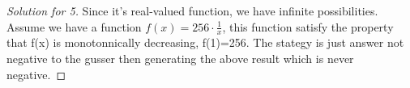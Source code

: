 \documentclass[12pt]{article}
\begin{document}
\begin{proof}[Solution for 5]
	Since it's real-valued function, we have infinite possibilities.\\
	Assume we have a function $f(x)=256\cdot\frac{1}{x}$, this function satisfy the property that f(x) is monotonnically decreasing, f(1)=256. The stategy is just answer not negative to the gusser then generating the above result which is never negative.
\end{proof}



\bigskip
\end{document}
